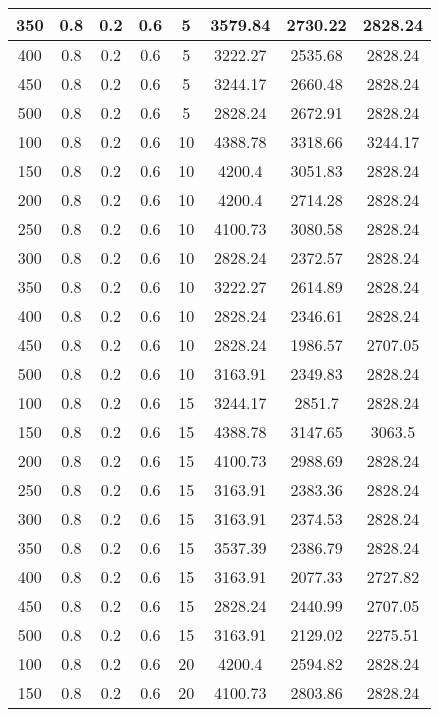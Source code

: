 \documentclass[a4paper, 12pt]{extreport}
\begin{document}
\begin{itemize}
\begin{longtable}{|c|c|c|c|c|c|c|c|}
			350 & 0.8 & 0.2 & 0.6 & 5 & 3579.84 & 2730.22 & 2828.24 \\\hline
			400 & 0.8 & 0.2 & 0.6 & 5 & 3222.27 & 2535.68 & 2828.24 \\\hline
			450 & 0.8 & 0.2 & 0.6 & 5 & 3244.17 & 2660.48 & 2828.24 \\\hline
			500 & 0.8 & 0.2 & 0.6 & 5 & 2828.24 & 2672.91 & 2828.24 \\\hline
			100 & 0.8 & 0.2 & 0.6 & 10 & 4388.78 & 3318.66 & 3244.17 \\\hline
			150 & 0.8 & 0.2 & 0.6 & 10 & 4200.4 & 3051.83 & 2828.24 \\\hline
			200 & 0.8 & 0.2 & 0.6 & 10 & 4200.4 & 2714.28 & 2828.24 \\\hline
			250 & 0.8 & 0.2 & 0.6 & 10 & 4100.73 & 3080.58 & 2828.24 \\\hline
			300 & 0.8 & 0.2 & 0.6 & 10 & 2828.24 & 2372.57 & 2828.24 \\\hline
			350 & 0.8 & 0.2 & 0.6 & 10 & 3222.27 & 2614.89 & 2828.24 \\\hline
			400 & 0.8 & 0.2 & 0.6 & 10 & 2828.24 & 2346.61 & 2828.24 \\\hline
			450 & 0.8 & 0.2 & 0.6 & 10 & 2828.24 & 1986.57 & 2707.05 \\\hline
			500 & 0.8 & 0.2 & 0.6 & 10 & 3163.91 & 2349.83 & 2828.24 \\\hline
			100 & 0.8 & 0.2 & 0.6 & 15 & 3244.17 & 2851.7 & 2828.24 \\\hline
			150 & 0.8 & 0.2 & 0.6 & 15 & 4388.78 & 3147.65 & 3063.5 \\\hline
			200 & 0.8 & 0.2 & 0.6 & 15 & 4100.73 & 2988.69 & 2828.24 \\\hline
			250 & 0.8 & 0.2 & 0.6 & 15 & 3163.91 & 2383.36 & 2828.24 \\\hline
			300 & 0.8 & 0.2 & 0.6 & 15 & 3163.91 & 2374.53 & 2828.24 \\\hline
			350 & 0.8 & 0.2 & 0.6 & 15 & 3537.39 & 2386.79 & 2828.24 \\\hline
			400 & 0.8 & 0.2 & 0.6 & 15 & 3163.91 & 2077.33 & 2727.82 \\\hline
			450 & 0.8 & 0.2 & 0.6 & 15 & 2828.24 & 2440.99 & 2707.05 \\\hline
			500 & 0.8 & 0.2 & 0.6 & 15 & 3163.91 & 2129.02 & 2275.51 \\\hline
			100 & 0.8 & 0.2 & 0.6 & 20 & 4200.4 & 2594.82 & 2828.24 \\\hline
			150 & 0.8 & 0.2 & 0.6 & 20 & 4100.73 & 2803.86 & 2828.24 \\\hline

\end{longtable}
\end{itemize}
\end{document}
